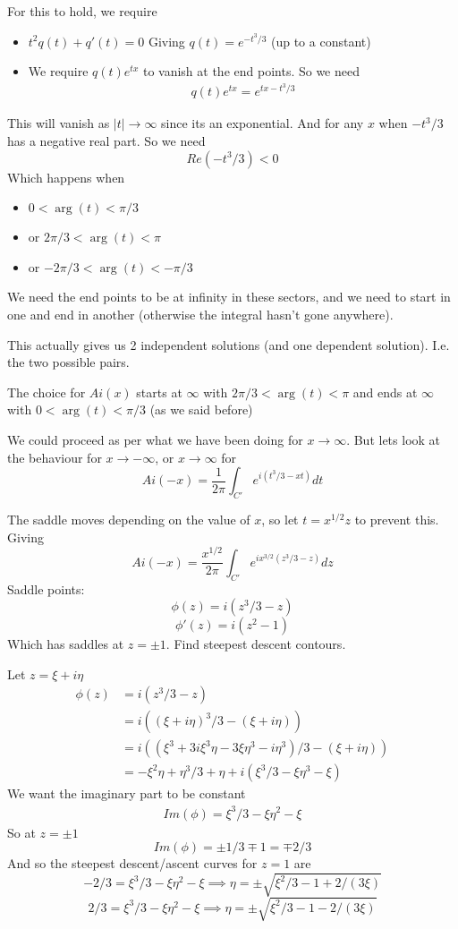 \documentclass{X:/Documents/Coding/Latex/myassignment}
\begin{document}
For this to hold, we require
\begin{itemize}
    \item $t^2 q(t) + q'(t) = 0$
    Giving $q(t) = e^{-t^3/3}$ (up to a constant)
    \item We require $q(t)e^{tx}$ to vanish at the end points.
    So we need
    \begin{align*}
        q(t)e^{tx} = e^{tx - t^3/3}
    \end{align*}
\end{itemize}
This will vanish as $|t| \to \infty$ since its an exponential. And for any $x$ when $-t^3/3$ has a negative real part.
So we need
\[Re(-t^3/3) < 0\]
Which happens when
\begin{itemize}
    \item $0<\arg(t)<\pi/3$

    \item or $2\pi/3 < \arg(t) < \pi$

    \item or $-2\pi/3 < \arg(t) < -\pi/3$
\end{itemize}
We need the end points to be at infinity in these sectors, and we need to start in one and end in another (otherwise the integral hasn't gone anywhere).

This actually gives us 2 independent solutions (and one dependent solution). I.e. the two possible pairs.

The choice for $Ai(x)$ starts at $\infty$ with $2\pi/3 < \arg(t) < \pi$ and ends at $\infty$ with $0<\arg(t) < \pi/3$ (as we said before)

We could proceed as per what we have been doing for $x\to\infty$. But lets look at the behaviour for $x\to-\infty$, or $x\to\infty$ for
\[Ai(-x) = \frac{1}{2\pi} \int_{C'} e^{i(t^3/3-xt)} dt\]


The saddle moves depending on the value of $x$, so let $t = x^{1/2}z$ to prevent this. Giving
\[Ai(-x) = \frac{x^{1/2}}{2\pi} \int_{C'} e^{ix^{3/2}(z^3/3-z)} dz\]
Saddle points:
\[\phi(z) = i(z^3/3-z)\]
\[\phi'(z) = i(z^2-1)\]
Which has saddles at $z=\pm 1$. Find steepest descent contours.

Let $z= \xi + i\eta$
\begin{align*}
    \phi(z) &= i(z^3/3-z)\\
    &=i\left((\xi + i\eta)^3/3 - (\xi + i\eta)\right)\\
    &=i \left((\xi^3 + 3i\xi^3\eta - 3\xi\eta^3 - i\eta^3)/3 - (\xi + i\eta)\right)\\
    &=-\xi^2\eta + \eta^3/3 + \eta + i \left(\xi^3/3 - \xi\eta^3 - \xi\right)
\end{align*}
We want the imaginary part to be constant
\begin{align*}
    Im(\phi) = \xi^3/3 - \xi\eta^2 - \xi
\end{align*}
So at $z=\pm 1$
\[Im(\phi) = \pm 1/3 \mp 1 = \mp 2/3\]
And so the steepest descent/ascent curves for $z=1$ are
\[-2/3 = \xi^3/3 - \xi\eta^2 - \xi \implies \eta = \pm \sqrt{\xi^2/3 - 1 + 2/(3\xi)}\]
\[2/3 = \xi^3/3 - \xi\eta^2 - \xi \implies \eta = \pm \sqrt{\xi^2/3 - 1 - 2/(3\xi)}\]
\end{document}
